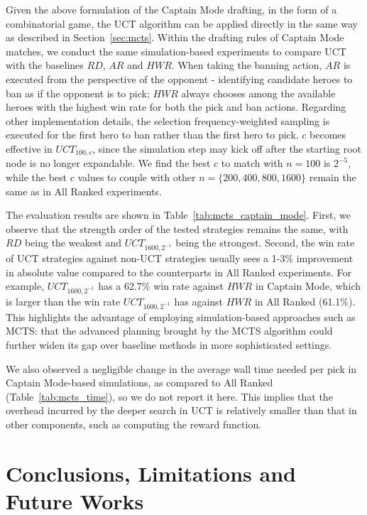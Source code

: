 Given the above formulation of the Captain Mode drafting, in the form of a combinatorial game, the UCT algorithm can be applied directly in the same way as described in Section~\ref{sec:mcts}. Within the drafting rules of Captain Mode matches, we conduct the same simulation-based experiments to compare UCT with the baselines $RD$, $AR$ and $HWR$. When taking the banning action, $AR$ is executed from the perspective of the opponent - identifying candidate heroes to ban as if the opponent is to pick; $HWR$ always chooses among the available heroes with the highest win rate for both the pick and ban actions. Regarding other implementation details, the selection frequency-weighted sampling is executed for the first hero to ban rather than the first hero to pick. $c$ becomes effective in $UCT_{100, c}$, since the simulation step may kick off after the starting root node is no longer expandable. We find the best $c$ to match with ${n=100}$ is $2^{-5}$, while the best $c$ values to couple with other ${n=\{200, 400, 800, 1600\}}$ remain the same as in All Ranked experiments.

The evaluation results are shown in Table~\ref{tab:mcts_captain_mode}. First, we observe that the strength order of the tested strategies remains the same, with $RD$ being the weakest and $UCT_{1600, 2^{-1}}$ being the strongest. Second, the win rate of UCT strategies against non-UCT strategies usually sees a 1-3\%  improvement in absolute value compared to the counterparts in All Ranked experiments. For example, $UCT_{1600, 2^{-1}}$ has a 62.7\% win rate against $HWR$ in Captain Mode, which is larger than the win rate $UCT_{1600, 2^{-1}}$ has against $HWR$ in All Ranked (61.1\%). This highlights the advantage of employing simulation-based approaches such as MCTS: that the advanced planning brought by the MCTS algorithm could further widen its gap over baseline methods in more sophisticated settings.

We also observed a negligible change in the average wall time needed per pick in Captain Mode-based simulations, as compared to All Ranked (Table~\ref{tab:mcts_time}), so we do not report it here. This implies that the overhead incurred by the deeper search in UCT is relatively smaller than that in other components, such as computing the reward function. 


\section{Conclusions, Limitations and Future Works}

